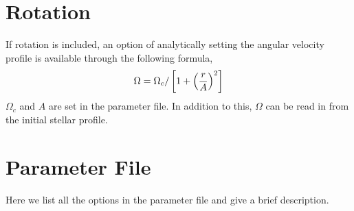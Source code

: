 \documentclass[10pt,nofootinbib]{article}
\begin{document}
\section{Rotation}
If rotation is included, an option of analytically setting the angular
velocity profile is available through the following formula,
\begin{equation}
\Omega = \Omega_c / \left[ 1 + \left({r \over A}\right)^2\right]
\label{eq:omega}
\end{equation}
$\Omega_c$ and $A$ are set in the parameter file.  In addition to
this, $\Omega$ can be read in from the initial stellar profile.


\section{Parameter File}
Here we list all the options in the parameter file and give a brief
description. 
\end{document}
